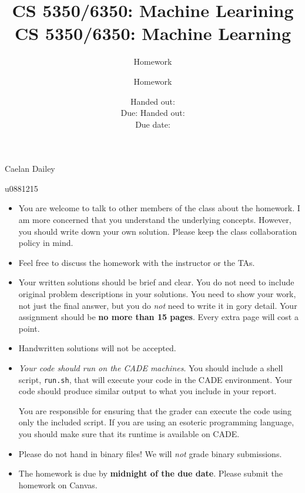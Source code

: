 \documentclass[12pt, fullpage,letterpaper]{article}
\title{CS 5350/6350: Machine Learining \semester}
\author{Homework \assignmentId}
\date{Handed out: \releaseDate\\
	Due: \dueDate}
\title{CS 5350/6350: Machine Learning \semester}
\author{Homework \assignmentId}
\date{Handed out: \releaseDate\\
  Due date: \dueDate}
\begin{document}
\maketitle
Caelan Dailey

u0881215



{\footnotesize
	\begin{itemize}
		\item You are welcome to talk to other members of the class about
		the homework. I am more concerned that you understand the
		underlying concepts. However, you should write down your own
		solution. Please keep the class collaboration policy in mind.
		
		\item Feel free to discuss the homework with the instructor or the TAs.
		
		\item Your written solutions should be brief and clear. You do not need to include original problem descriptions in your solutions. You need to
		show your work, not just the final answer, but you do \emph{not}
		need to write it in gory detail. Your assignment should be {\bf no
			more than 15 pages}. Every extra page will cost a point.
		
		\item Handwritten solutions will not be accepted.
		
		
		\item {\em Your code should run on the CADE machines}. You should
		include a shell script, {\tt run.sh}, that will execute your code
		in the CADE environment. Your code should produce similar output
		to what you include in your report.
		
		You are responsible for ensuring that the grader can execute the
		code using only the included script. If you are using an
		esoteric programming language, you should make sure that its
		runtime is available on CADE.
		
		\item Please do not hand in binary files! We will {\em not} grade
		binary submissions.
		
		\item The homework is due by \textbf{midnight of the due date}. Please submit
		the homework on Canvas.
		
	\end{itemize}
}
\end{document}
